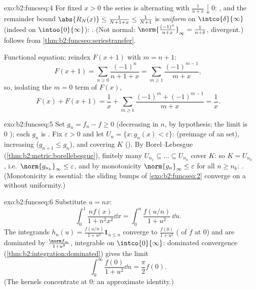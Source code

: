 \begin{solution}{exo:b2:funcseq:4}
For fixed $x > 0$ the series is alternating with $\frac{1}{n + x}
\downarrow 0$: , and the remainder bound
$\abs{R_N(x)} \leq \frac{1}{N + 1 + x} \leq \frac{1}{N+1}$ is
\emph{uniform} on $\intco{\delta}{\infty}$ (indeed on
$\intoo{0}{\infty}$): . (Not normal:
$\norm{\frac{(-1)^n}{n+x}}_\infty = \frac{1}{n + \delta}$,
divergent.)  follows from
\cref{thm:b2:funcseq:seriestransfer}.

Functional equation: reindex $F(x + 1)$ with $m = n + 1$:
\[
F(x+1) = \sum_{n\geq0} \frac{(-1)^n}{n + 1 + x}
= \sum_{m\geq1}\frac{(-1)^{m-1}}{m+x} ,
\]
so, isolating the $m = 0$ term of $F(x)$,
\[
F(x) + F(x+1)
= \frac{1}{x} + \sum_{m\geq1}
\frac{(-1)^m + (-1)^{m-1}}{m+x} = \frac1x .
\]
\end{solution}

\begin{solution}{exo:b2:funcseq:5}
Set $g_n = f_n - f \geq 0$ (decreasing in $n$, by hypothesis; the
limit is $0$ ); each $g_n$ is . Fix $\varepsilon
> 0$ and let $U_n = \{x : g_n(x) < \varepsilon\}$:  (preimage
of an  set), increasing ($g_{n+1} \leq g_n$), and covering $K$
(). By Borel--Lebesgue
(\cref{thm:b2:metric:borellebesgue}), finitely many $U_{n_1}
\subseteq \dots \subseteq U_{n_k}$ cover $K$: so $K = U_{n_k}$,
i.e.\ $\norm{g_{n_k}}_\infty \leq \varepsilon$, and by monotonicity
$\norm{g_n}_\infty \leq \varepsilon$ for all $n \geq n_k$: . (Monotonicity is essential: the sliding bumps of
\cref{exo:b2:funcseq:2} converge  on a  without
uniformity.)
\end{solution}

\begin{solution}{exo:b2:funcseq:6}
Substitute $u = nx$:
\[
\int_0^1 \frac{n f(x)}{1 + n^2x^2}\dd x
= \int_0^n \frac{f(u/n)}{1 + u^2}\,\dd u .
\]
The integrands $h_n(u) = \frac{f(u/n)}{1+u^2}\mathbf{1}_{u \leq n}$
converge  to $\frac{f(0)}{1+u^2}$ ( of $f$ at
$0$) and are dominated by $\frac{\norm f_\infty}{1 + u^2}$,
integrable on $\intco{0}{\infty}$: dominated convergence
(\cref{thm:b2:integration:dominated}) gives the limit
\[
\int_0^\infty \frac{f(0)}{1 + u^2}\dd u = \frac{\pi}{2} f(0) .
\]
(The kernels concentrate at $0$: an approximate identity.)
\end{solution}

